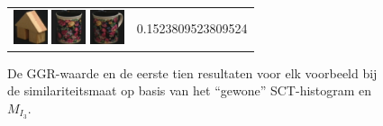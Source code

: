 \begin{figure}[!bp]
\begin{tabular}{m{11cm} | m{3cm} |}
\includegraphics[width=1cm]{coil/beeld-46.eps}
\includegraphics[width=1cm]{coil/beeld-62.eps}
\includegraphics[width=1cm]{coil/beeld-63.eps}
& {\scriptsize 0.1523809523809524}
\\
\end{tabular}
\vspace{5pt}
\caption{\label{fig:results_sct_histgeb}De GGR-waarde en de eerste tien resultaten voor elk 
voorbeeld bij de similariteitsmaat op basis van het ``gewone'' SCT-histogram en $M_{I_3}$.}
\end{figure}

